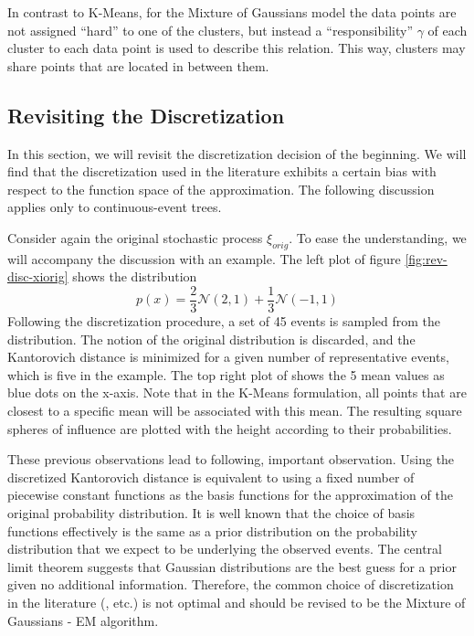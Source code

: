 In contrast to K-Means, for the Mixture of Gaussians model the data points are not assigned ``hard'' to one of the clusters, but instead a ``responsibility'' $\gamma$ of each cluster to each data point is used to describe this relation. This way, clusters may share points that are located in between them.
\subsection{Revisiting the Discretization}
\label{sec:revisiting-discretization}
In this section, we will revisit the discretization decision of the beginning.
We will find that the discretization used in the literature exhibits a certain bias with respect to the function space of the approximation. The following discussion applies only to continuous-event trees.

Consider again the original stochastic process $\xi_{orig}$. To ease the understanding, we will accompany the discussion with an example. The left plot of figure \ref{fig:rev-disc-xiorig} shows the distribution
\begin{equation}
  \label{eq:24}
  p(x) = \frac{2}{3}\mathcal{N}(2,1) + \frac{1}{3}\mathcal{N}(-1,1)
\end{equation}
 Following the discretization procedure, a set of 45 events is sampled from the distribution.
 The notion of the original distribution is discarded, and the Kantorovich distance is minimized for a given number of representative events, which is five in the example.
 The top right plot of shows the 5 mean values as blue dots on the x-axis.
 Note that in the K-Means formulation, all points that are closest to a specific mean will be associated with this mean.
 The resulting square spheres of influence are plotted with the height according to their probabilities.

These previous observations lead to following, important observation.
Using the discretized Kantorovich distance is equivalent to using a fixed number of piecewise constant functions as the basis functions for the approximation of the original probability distribution.
It is well known that the choice of basis functions effectively is the same as a prior distribution on the probability distribution that we expect to be underlying the observed events.
The central limit theorem suggests that Gaussian distributions are the best guess for a prior given no additional information.
Therefore, the common choice of discretization in the literature (\cite{Dupacova2003}, etc.) is not optimal and should be revised to be the Mixture of Gaussians - EM algorithm.

